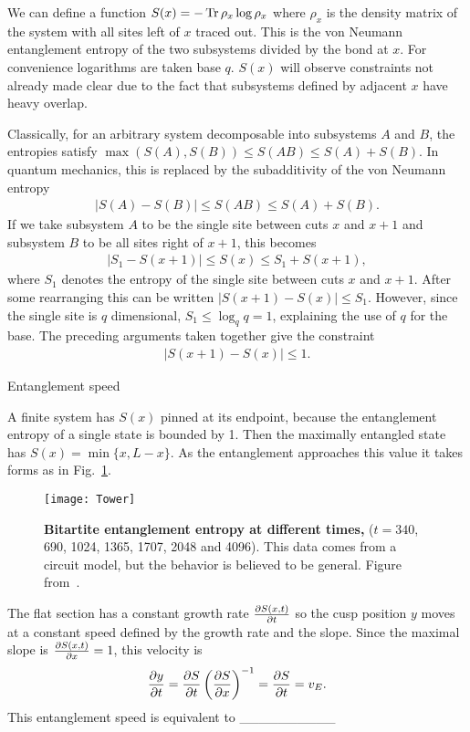 We can define a function $S(x) = -\operatorname{Tr}\rho_x\log\rho_x$ where $\rho_x$ is the density matrix of the system with all sites left of $x$ traced out. This is the von Neumann entanglement entropy of the two subsystems divided by the bond at $x$. For convenience logarithms are taken base $q$. $S(x)$ will observe constraints not already made clear due to the fact that subsystems defined by adjacent $x$ have heavy overlap.

Classically, for an arbitrary system decomposable into subsystems $A$ and $B$, the entropies satisfy $\max(S(A), S(B)) \leq S(AB)\leq S(A) + S(B)$. In quantum mechanics, this is replaced by the subadditivity of the von Neumann entropy 
\begin{align}
\left|S(A)-S(B)\right| \leq S(AB)\leq S(A) + S(B). \label{eqn:subadd}
\end{align}
If we take subsystem $A$ to be the single site between cuts $x$ and $x+1$ and subsystem $B$ to be all sites right of $x+1$, this becomes
\begin{align}
\left|S_1 - S(x+1)\right| \leq S(x) \leq S_1 + S(x+1),
\end{align}
where $S_1$ denotes the entropy of the single site between cuts $x$ and $x+1$. After some rearranging this can be written $\left|S(x+1) - S(x)\right| \leq S_1$. However, since the single site is $q$ dimensional, $S_1 \leq \log_q q = 1$, explaining the use of $q$ for the base. The preceding arguments taken together give the constraint
\begin{align}
\left|S(x+1) - S(x)\right| \leq 1. \label{eqn:offbyone}
\end{align}

Entanglement speed

A finite system has $S(x)$ pinned at its endpoint, because the entanglement entropy of a single state is bounded by 1. Then the maximally entangled state has $S(x) = \min\{x,L-x\}$. As the entanglement approaches this value it takes forms as in Fig.~\ref{fig:Tower}.
\begin{figure}
	\centering
	\texttt{[image: Tower]}
	\caption{\textbf{Bitartite entanglement entropy at different times,} ($t = 340$, 690, 1024, 1365, 1707, 2048 and 4096). This data comes from a circuit model, but the behavior is believed to be general. Figure from~\cite{Nahum2017}.}
	\label{fig:Tower}
\end{figure}
The flat section has a constant growth rate $\frac{\partial S(x,t)}{\partial t}$ so the cusp position $y$ moves at a constant speed defined by the growth rate and the slope. Since the maximal slope is $\frac{\partial S(x,t)}{\partial x}=1$, this velocity is
\begin{align}
\frac{\partial y}{\partial t} = \frac{\partial S}{\partial t}\left(\frac{\partial S}{\partial x}\right)^{-1} = \frac{\partial S}{\partial t} = v_E. 
\label{eqn:vE}
\end{align}
This entanglement speed is equivalent to \_\_\_\_\_\_\_\_\_\_

